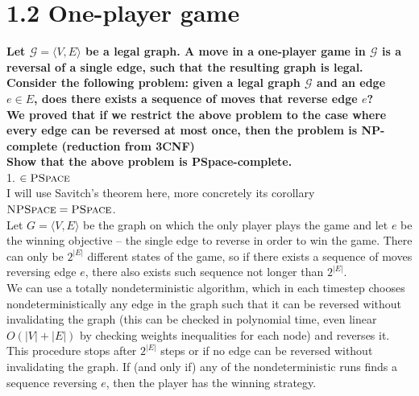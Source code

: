 \section*{1.2 One-player game}
\textbf{Let $\mathcal{G} = \langle V, E \rangle$ be a legal graph. A move in a one-player game in $\mathcal{G}$
is a reversal of a single edge, such that the resulting graph is legal.\\
Consider the following problem: given a legal graph $\mathcal{G}$ and an edge $e \in E$, does there exists
a sequence of moves that reverse edge $e$?\\
We proved that if we restrict the above problem to the case where every edge
can be reversed at most once, then the problem is NP-complete (reduction
from 3CNF)\\
Show that the above problem is PSpace-complete.}\\
1. \underline{$\in \textsc{PSpace}$}\\
I will use Savitch's theorem here, more concretely its corollary $\textsc{NPSpace} = \textsc{PSpace}$.\\
Let $G = \langle V, E \rangle$ be the graph on which the only player plays the game and let $e$ be the
winning objective -- the single edge to reverse in order to win the game. There can only be $2^{|E|}$
different states of the game, so if there exists a sequence of moves reversing edge $e$, there also
exists such sequence not longer than $2^{|E|}$.\\
We can use a totally nondeterministic algorithm, which in each timestep chooses nondeterministically
any edge in the graph such that it can be reversed without invalidating the graph (this can be checked
in polynomial time, even linear $O(|V|+|E|)$ by checking weights inequalities for each node) and reverses it.
This procedure stops after $2^{|E|}$ steps or if no edge can be reversed without invalidating the graph.
If (and only if) any of the nondeterministic runs finds a sequence reversing $e$, then the player has
the winning strategy.\\

